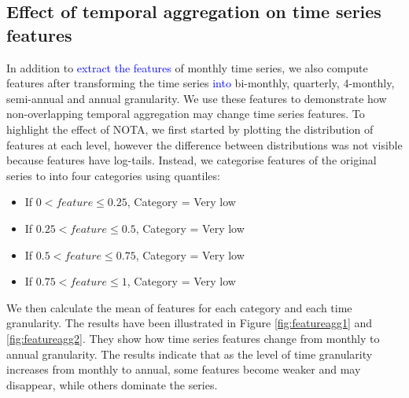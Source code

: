 \documentclass[preprint, 3p,
authoryear]{elsarticle} %
\providecommand{\tightlist}{%
  \setlength{\itemsep}{0pt}\setlength{\parskip}{0pt}}
\begin{document}
\hypertarget{taeffect}{%
\subsection{Effect of temporal aggregation on time series
features}\label{taeffect}}

In addition to \textcolor{blue}{extract the features} of monthly time
series, we also compute features after transforming the time series
\textcolor{blue}{into} bi-monthly, quarterly, 4-monthly, semi-annual and
annual granularity. We use these features to demonstrate how
non-overlapping temporal aggregation may change time series features. To
highlight the effect of NOTA, we first started by plotting the
distribution of features at each level, however the difference between
distributions was not visible because features have log-tails. Instead,
we categorise features of the original series to into four categories
using quantiles:

\begin{itemize}
\tightlist
\item
  If \(0 < feature \leqslant 0.25\), Category = Very low
\item
  If \(0.25 < feature \leqslant 0.5\), Category = Very low
\item
  If \(0.5 < feature \leqslant 0.75\), Category = Very low
\item
  If \(0.75 < feature \leqslant 1\), Category = Very low
\end{itemize}

We then calculate the mean of features for each category and each time
granularity. The results have been illustrated in Figure
\ref{fig:featureagg1} and \ref{fig:featureagg2}. They show how time
series features change from monthly to annual granularity. The results
indicate that as the level of time granularity increases from monthly to
annual, some features become weaker and may disappear, while others
dominate the series.
\end{document}
